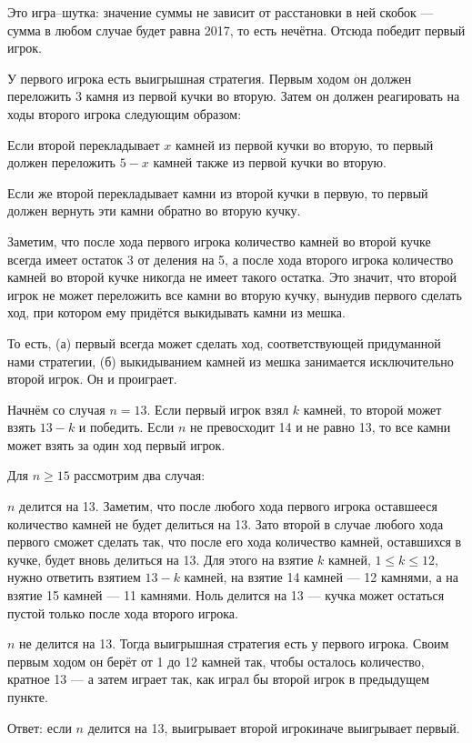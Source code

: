 \begin{itemize}

\itA Это игра–шутка: значение суммы не зависит от расстановки в ней скобок — сумма в любом случае будет равна 2017, то есть нечётна. Отсюда победит первый игрок.

\itB У первого игрока есть выигрышная стратегия. Первым ходом он должен переложить 3 камня из первой кучки во вторую. Затем он должен реагировать на ходы второго игрока следующим образом:

\subitem Если второй перекладывает $x$ камней из первой кучки во вторую, то первый должен переложить $5-x$ камней также из первой кучки во вторую.

\subitem Если же второй перекладывает камни из второй кучки в первую, то первый должен вернуть эти камни обратно во вторую кучку.

Заметим, что после хода первого игрока количество камней во второй кучке всегда имеет остаток 3 от деления на 5, а после хода второго игрока количество камней во второй кучке никогда не имеет такого остатка. Это значит, что второй игрок не может переложить все камни во вторую кучку, вынудив первого сделать ход, при котором ему придётся выкидывать камни из мешка.

То есть, (а) первый всегда может сделать ход, соответствующей придуманной нами стратегии, (б) выкидыванием камней из мешка занимается исключительно второй игрок. Он и проиграет.

\itC Начнём со случая $n=13$. Если первый игрок взял $k$ камней, то второй может взять $13-k$ и победить. Если $n$ не превосходит 14 и не равно 13, то все камни может взять за один ход первый игрок.

Для $n \ge 15$ рассмотрим два случая:

\subitem $n$ делится на 13. Заметим, что после любого хода первого игрока оставшееся количество камней не будет делиться на 13. Зато второй в случае любого хода первого сможет сделать так, что после его хода количество камней, оставшихся в кучке, будет вновь делиться на 13. Для этого на взятие $k$ камней, $1 \le k \le 12$, нужно ответить взятием $13-k$ камней, на взятие 14 камней — 12 камнями, а на взятие 15 камней — 11 камнями. Ноль делится на 13 — кучка может остаться пустой только после хода второго игрока.

\subitem $n$ не делится на 13. Тогда выигрышная стратегия есть у первого игрока. Своим первым ходом он берёт от 1 до 12 камней так, чтобы осталось количество, кратное 13 — а затем играет так, как играл бы второй игрок в предыдущем пункте.

Ответ: если $n$ делится на 13, выигрывает второй игрок\scolon иначе выигрывает первый.
\end{itemize}